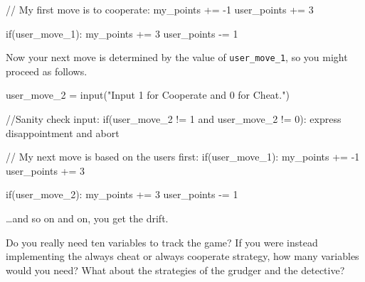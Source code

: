 \documentclass[
  letterpaper,
  DIV=11,
  numbers=noendperiod]{scrreprt}
\newenvironment{Shaded}{\begin{snugshade}}{\end{snugshade}}
\newcommand{\CommentTok}[1]{\textcolor[rgb]{0.37,0.37,0.37}{#1}}
\newcommand{\ControlFlowTok}[1]{\textcolor[rgb]{0.00,0.23,0.31}{#1}}
\newcommand{\DecValTok}[1]{\textcolor[rgb]{0.68,0.00,0.00}{#1}}
\newcommand{\FunctionTok}[1]{\textcolor[rgb]{0.28,0.35,0.67}{#1}}
\newcommand{\NormalTok}[1]{\textcolor[rgb]{0.00,0.23,0.31}{#1}}
\newcommand{\OperatorTok}[1]{\textcolor[rgb]{0.37,0.37,0.37}{#1}}
\newcommand{\StringTok}[1]{\textcolor[rgb]{0.13,0.47,0.30}{#1}}
\begin{document}
\begin{Shaded}
\begin{Highlighting}[]
\CommentTok{// My first move is to cooperate:}
\NormalTok{my\_points }\OperatorTok{+=} \OperatorTok{{-}}\DecValTok{1}
\NormalTok{user\_points }\OperatorTok{+=} \DecValTok{3}

\ControlFlowTok{if}\OperatorTok{(}\NormalTok{user\_move\_1}\OperatorTok{):}
\NormalTok{    my\_points }\OperatorTok{+=} \DecValTok{3}
\NormalTok{    user\_points }\OperatorTok{{-}=} \DecValTok{1}
\end{Highlighting}
\end{Shaded}

Now your next move is determined by the value of \texttt{user\_move\_1},
so you might proceed as follows.

\begin{Shaded}
\begin{Highlighting}[]
\NormalTok{user\_move\_2 }\OperatorTok{=} \FunctionTok{input}\OperatorTok{(}\StringTok{"Input 1 for Cooperate and 0 for Cheat."}\OperatorTok{)}

\CommentTok{//Sanity check input:}
\ControlFlowTok{if}\OperatorTok{(}\NormalTok{user\_move\_2 }\OperatorTok{!=} \DecValTok{1}\NormalTok{ and user\_move\_2 }\OperatorTok{!=} \DecValTok{0}\OperatorTok{):}
\NormalTok{    express disappointment and abort}
\end{Highlighting}
\end{Shaded}

\begin{Shaded}
\begin{Highlighting}[]
\CommentTok{// My next move is based on the user\textquotesingle{}s first:}
\ControlFlowTok{if}\OperatorTok{(}\NormalTok{user\_move\_1}\OperatorTok{):}
\NormalTok{    my\_points }\OperatorTok{+=} \OperatorTok{{-}}\DecValTok{1}
\NormalTok{    user\_points }\OperatorTok{+=} \DecValTok{3}

\ControlFlowTok{if}\OperatorTok{(}\NormalTok{user\_move\_2}\OperatorTok{):}
\NormalTok{    my\_points }\OperatorTok{+=} \DecValTok{3}
\NormalTok{    user\_points }\OperatorTok{{-}=} \DecValTok{1}
\end{Highlighting}
\end{Shaded}

\ldots and so on and on, you get the drift.

\begin{tcolorbox}[standard jigsaw,toptitle=1mm, titlerule=0mm, bottomtitle=1mm, title=\textcolor{quarto-callout-caution-color}{\faFire}\hspace{0.5em}{Food for thought.}, coltitle=black, colback=white, toprule=.15mm, colframe=quarto-callout-caution-color-frame, arc=.35mm, rightrule=.15mm, opacityback=0, left=2mm, leftrule=.75mm, colbacktitle=quarto-callout-caution-color!10!white, opacitybacktitle=0.6, bottomrule=.15mm]
Do you really need ten variables to track the game? If you were instead
implementing the always cheat or always cooperate strategy, how many
variables would you need? What about the strategies of the grudger and
the detective?
\end{tcolorbox}
\end{document}
